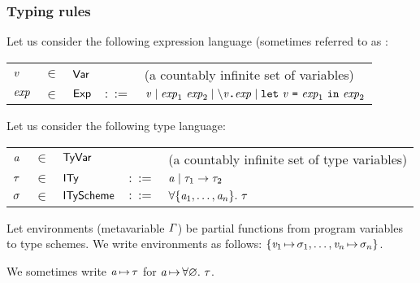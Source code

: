 \documentclass[12pt,red]{beamer}
\begin{document}
\begin{frame}
  \frametitle{Typing rules}

  Let us consider the following expression language (sometimes
  referred to as \COREML:
  \begin{center}
    \begin{tabular}{lllrl}
      $\mathit{v}$ & $\in$ & $\mathsf{Var}$ &       & (a countably infinite set of variables)\\
      $\mathit{exp}$ & $\in$ & $\mathsf{Exp}$ & $::=$ & $\mathit{v}
                                                \mid\mathit{exp}_1\ \mathit{exp}_2
                                                \mid\textbf{\texttt{$\backslash$}}\mathit{v}\textbf{\texttt{.}}\mathit{exp}
                                                \mid\mathtt{let}\ \mathit{v}\ \textbf{\texttt{=}}\ \mathit{exp}_1\ \mathtt{in}\ \mathit{exp}_2$
    \end{tabular}
  \end{center}

  \vspace{0.1in}

  Let us consider the following type language:
  \begin{center}
    \begin{tabular}{lllrl}
      $\mathit{a}$     & $\in$ & $\mathsf{TyVar}$     &       & (a countably infinite set of type variables)\\
      $\mathit{\tau}$       & $\in$ & $\mathsf{ITy}$       & $::=$ & $\mathit{a}
                                                            \mid\mathit{\tau}_1\rightarrow\mathit{\tau}_2$\\
      $\mathit{\sigma}$ & $\in$ & $\mathsf{ITyScheme}$ & $::=$ & $\forall\{\mathit{a}_1,\dots,\mathit{a}_n\}.\ \mathit{\tau}$
    \end{tabular}
  \end{center}

  \vspace{0.1in}

  Let environments (metavariable $\mathit{\Gamma}$) be partial functions
  from program variables to type schemes.  We write environments as follows:
  $\{\mathit{v}_1\,{\mapsto}\,\mathit{\sigma}_1,\dots,\mathit{v}_n\,{\mapsto}\,\mathit{\sigma}_n\}$.

  \vspace{0.1in}

  We sometimes write $\mathit{a}\,{\mapsto}\,\mathit{\tau}$ for
  $\mathit{a}\,{\mapsto}\,\forall\mathord\varnothing.\ \mathit{\tau}$.

  \vspace{0.1in}
\end{frame}
\end{document}
